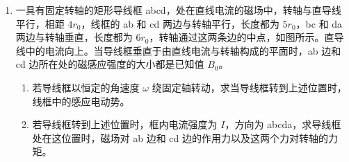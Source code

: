\documentclass[\gkver]{gaokaozhenti}
\begin{document}
\begin{enumerate}
{当外电阻最小时，通过电池的电流最大

$I_{\text{最大}}=\frac{E}{R_{\text{最小}}+r}=\frac{6.3}{1.6+0.5}\UA=3\UA$ ⑦

电流的变化范围在 $2.1\UA$ 到 $3\UA$ 之间。
}

\item
一具有固定转轴的矩形导线框 abcd，处在直线电流的磁场中，转轴与直导线平行，相距 $4r_{0}$，线框的 ab 和 cd 两边与转轴平行，长度都为 $5r_{0}$，bc 和 da 两边与转轴垂直，长度都为 $6r_{0}$，转轴通过这两条边的中点，如图所示。直导线中的电流向上。当导线框垂直于由直线电流与转轴构成的平面时，ab 边和 cd 边所在处的磁感应强度的大小都是已知值 $B_{0}$。
\begin{enumerate}
	\item
	若导线框以恒定的角速度 $\omega$ 绕固定轴转动，求当导线框转到上述位置时，线框中的感应电动势。
	\item
	若导线框转到上述位置时，框内电流强度为 $I$，方向为 abcda，求导线框处在这位置时，磁场对 ab 边和 cd 边的作用力以及这两个力对转轴的力矩。
\end{enumerate}
\onepicture[align=right, h=7.80cm]{}
\end{enumerate}
\end{document}
